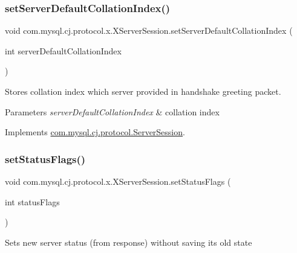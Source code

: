 \subsubsection{\texorpdfstring{set\+Server\+Default\+Collation\+Index()}{setServerDefaultCollationIndex()}}
{\footnotesize\ttfamily void com.\+mysql.\+cj.\+protocol.\+x.\+X\+Server\+Session.\+set\+Server\+Default\+Collation\+Index (\begin{DoxyParamCaption}\item[{int}]{server\+Default\+Collation\+Index }\end{DoxyParamCaption})}

Stores collation index which server provided in handshake greeting packet.


\begin{DoxyParams}{Parameters}
{\em server\+Default\+Collation\+Index} & collation index \\
\hline
\end{DoxyParams}


Implements \mbox{\hyperlink{interfacecom_1_1mysql_1_1cj_1_1protocol_1_1_server_session_aa712ac71a0771a45a3f8b46ceaac4178}{com.\+mysql.\+cj.\+protocol.\+Server\+Session}}.

\mbox{\label{classcom_1_1mysql_1_1cj_1_1protocol_1_1x_1_1_x_server_session_a30539eae0f7311ac3cd5c9f44c8f7585}} 
\subsubsection{\texorpdfstring{set\+Status\+Flags()}{setStatusFlags()}\hspace{0.1cm}{\footnotesize\ttfamily [1/2]}}
{\footnotesize\ttfamily void com.\+mysql.\+cj.\+protocol.\+x.\+X\+Server\+Session.\+set\+Status\+Flags (\begin{DoxyParamCaption}\item[{int}]{status\+Flags }\end{DoxyParamCaption})}

Sets new server status (from response) without saving it\textquotesingle{}s old state


